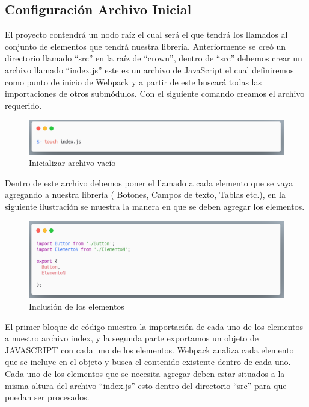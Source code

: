 \subsection{Configuración Archivo Inicial}
El proyecto contendrá un nodo raíz el cual será el que tendrá los llamados al conjunto de elementos que tendrá nuestra librería. Anteriormente se creó un directorio llamado “src” en la raíz de “crown”, dentro de “src” debemos crear un archivo llamado “index.js” este es un archivo de JavaScript el cual definiremos como punto de inicio de Webpack  y a partir de este buscará todas las importaciones de otros submódulos. Con el siguiente comando creamos el archivo requerido.
\newline
\newline
     \begin{figure}[H]
    \includegraphics[width=1\textwidth]{./Imagenes/carbon.png}
    \caption[Inicializar archivo vacío]{Inicializar archivo vacío}
    \end{figure}
\newline
\newline
Dentro de este archivo debemos poner el llamado a cada elemento que se vaya agregando a nuestra librería ( Botones, Campos de texto, Tablas etc.), en la siguiente ilustración se muestra la manera en que se deben agregar los elementos.
\newline
\newline
\begin{figure}[H]
    \includegraphics[width=1\textwidth]{./Imagenes/carbon-2.png}
    \caption[Inclusión de los elementos]{Inclusión de los elementos}
    \end{figure}
\newline
\newline
El primer bloque de código muestra la importación de cada uno de los elementos a nuestro archivo index, y la segunda parte exportamos un objeto de JAVASCRIPT con cada uno de los elementos.
Webpack analiza cada elemento que se incluye en el objeto y busca el contenido existente dentro de cada uno.
Cada uno de los elementos que se necesita agregar deben estar situados a la misma altura del archivo “index.js” esto dentro del directorio “src” para que puedan ser procesados.
\clearpage


